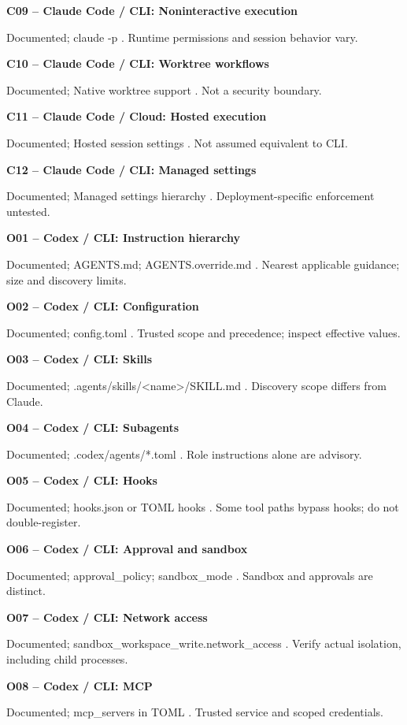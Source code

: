 \documentclass[11pt,letterpaper]{article}
\begin{document}
\textbf{C09 -- Claude Code / CLI: Noninteractive execution}\par Documented; claude -p \cite{chead}. Runtime permissions and session behavior vary.

\textbf{C10 -- Claude Code / CLI: Worktree workflows}\par Documented; Native worktree support \cite{cwork}. Not a security boundary.

\textbf{C11 -- Claude Code / Cloud: Hosted execution}\par Documented; Hosted session settings \cite{ccloud}. Not assumed equivalent to CLI.

\textbf{C12 -- Claude Code / CLI: Managed settings}\par Documented; Managed settings hierarchy \cite{csettings}. Deployment-specific enforcement untested.

\textbf{O01 -- Codex / CLI: Instruction hierarchy}\par Documented; AGENTS.md; AGENTS.override.md \cite{oagents}. Nearest applicable guidance; size and discovery limits.

\textbf{O02 -- Codex / CLI: Configuration}\par Documented; config.toml \cite{oconfig}. Trusted scope and precedence; inspect effective values.

\textbf{O03 -- Codex / CLI: Skills}\par Documented; .agents/skills/\textless{}name\textgreater{}/SKILL.md \cite{oskills}. Discovery scope differs from Claude.

\textbf{O04 -- Codex / CLI: Subagents}\par Documented; .codex/agents/*.toml \cite{osub}. Role instructions alone are advisory.

\textbf{O05 -- Codex / CLI: Hooks}\par Documented; hooks.json or TOML hooks \cite{ohooks}. Some tool paths bypass hooks; do not double-register.

\textbf{O06 -- Codex / CLI: Approval and sandbox}\par Documented; approval\_policy; sandbox\_mode \cite{osec}. Sandbox and approvals are distinct.

\textbf{O07 -- Codex / CLI: Network access}\par Documented; sandbox\_workspace\_write.network\_access \cite{oconfig}. Verify actual isolation, including child processes.

\textbf{O08 -- Codex / CLI: MCP}\par Documented; mcp\_servers in TOML \cite{omcp}. Trusted service and scoped credentials.
\end{document}
